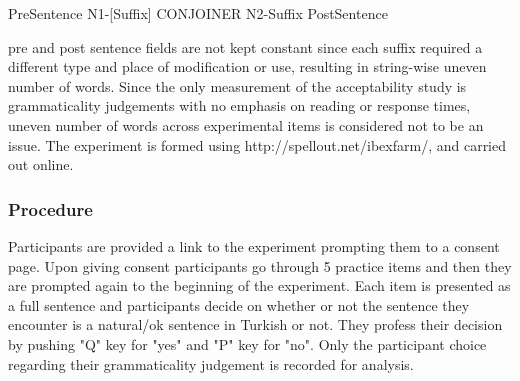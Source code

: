 \begin{exe}
    \ex \label{accepttemplate}
    PreSentence N1-[Suffix] CONJOINER N2-Suffix PostSentence
\end{exe}

pre and post sentence fields are not kept constant since each suffix required a different type and place of modification or use, resulting in string-wise uneven number of words. Since the only measurement of the acceptability study is grammaticality judgements with no emphasis on reading or response times, uneven number of words across experimental items is considered not to be an issue. The experiment is formed using http://spellout.net/ibexfarm/, and carried out online. 

\subsubsection{Procedure}
Participants are provided a link to the experiment prompting them to a consent page. Upon giving consent participants go through 5 practice items and then they are prompted again to the beginning of the experiment. Each item is presented as a full sentence and participants decide on whether or not the sentence they encounter is a natural/ok sentence in Turkish or not. They profess their decision by pushing "Q" key for "yes" and "P" key for "no". Only the participant choice regarding their grammaticality judgement is recorded for analysis.




